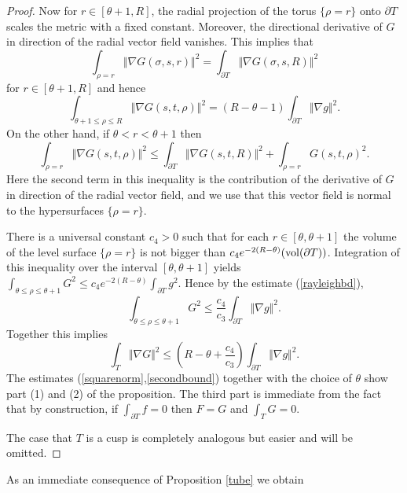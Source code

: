\documentclass[11pt]{amsart}
\theoremstyle{plain}
\theoremstyle{plain}
\theoremstyle{definition}
\begin{document}
\begin{proof}
Now for $r\in [\theta+1,R]$, the radial projection of 
the torus $\{\rho=r\}$ onto $\partial T$ 
scales the metric with a fixed constant. Moreover,
the directional derivative of $G$ in direction of the
radial vector field vanishes. This implies that   
\[\int_{\rho=r}\Vert \nabla G(\sigma,s,r)\Vert^2 =
\int_{\partial T} \Vert \nabla G(\sigma,s,R)\Vert^2\]
for $r\in [\theta +1,R]$ and hence
\[\int_{\theta+1\leq \rho\leq R} \Vert \nabla G(s,t,\rho)\Vert^2=
(R-\theta-1)\int_{\partial T}\Vert \nabla g\Vert^2.\]
On the other  hand, if
$\theta< r<\theta+1$ then 
\[\int_{\rho=r}\Vert \nabla G(s,t,\rho)\Vert^2 \leq 
\int_{\partial T}\Vert \nabla G(s,t,R)\Vert^2+\int_{\rho=r}G(s,t,\rho)^2.\]
Here the second term in this inequality is the contribution of the
derivative of $G$ in direction of the radial vector field, and we use
that this vector field is normal to the hypersurfaces
$\{\rho=r\}$. 

There is a universal constant $c_4>0$ such that for each $r\in 
[\theta,\theta+1]$ the volume of the level surface
$\{\rho=r\}$  is not bigger than 
$c_4e^{-2(R-\theta)}({\rm vol}(\partial T))$. Integration of this
inequality over the interval $[\theta,\theta +1]$ yields
$\int_{\theta\leq \rho\leq \theta +1}G^2\leq
c_4e^{-2(R-\theta)}\int_{\partial T}g^2$. Hence by the estimate
(\ref{rayleighbd}), 
\[\int_{\theta\leq \rho\leq \theta+1}G^2\leq 
\frac{c_4}{c_3}\int_{\partial T}\Vert \nabla g\Vert^2.\]
Together this
implies
\begin{equation}\label{secondbound}
\int_T\Vert \nabla G\Vert^2\leq (R-\theta +\frac{c_4}{c_3})
\int_{\partial T} \Vert \nabla g\Vert^2. \end{equation}
The estimates (\ref{squarenorm},\ref{secondbound}) 
together with the choice of $\theta$ show 
part (1) and (2) of the proposition. The third part is immediate from the 
fact that by construction, if $\int _{\partial T}f=0$ then $F=G$ and 
$\int_{T}G=0$.

The case that $T$ is a cusp is completely analogous but easier 
and will be omitted.
\end{proof} 



As an immediate consequence of Proposition \ref{tube} we obtain
\end{document}
